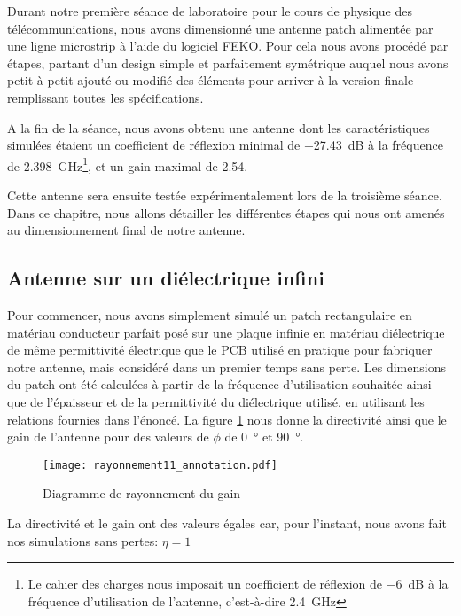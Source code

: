 Durant notre première séance de laboratoire pour le cours de physique des télécommunications, nous avons dimensionné une antenne patch alimentée par une ligne microstrip à l'aide du logiciel FEKO. Pour cela nous avons procédé par étapes, partant d'un design simple et parfaitement symétrique auquel nous avons petit à petit ajouté ou modifié des éléments pour arriver à la version finale remplissant toutes les spécifications.

A la fin de la séance, nous avons obtenu une antenne dont les caractéristiques simulées étaient un coefficient de réflexion minimal de \SI{-27.43}{\deci\bel} à la fréquence de \SI{2.398}{\giga\hertz}\footnote{Le cahier des charges nous imposait un coefficient de réflexion de \SI{-6}{\deci\bel} à la fréquence d'utilisation de l'antenne, c'est-à-dire \SI{2.4}{\giga\hertz}}, et un gain maximal de \num{2.54}.

Cette antenne sera ensuite testée expérimentalement lors de la troisième séance. Dans ce chapitre, nous allons détailler les différentes étapes qui nous ont amenés au dimensionnement final de notre antenne.

\subsection{Antenne sur un diélectrique infini}
Pour commencer, nous avons simplement simulé un patch rectangulaire en matériau conducteur parfait posé sur une plaque infinie en matériau diélectrique de même permittivité électrique que le PCB utilisé en pratique pour fabriquer notre antenne, mais considéré dans un premier temps sans perte. Les dimensions du patch ont été calculées à partir de la fréquence d'utilisation souhaitée ainsi que de l'épaisseur et de la permittivité du diélectrique utilisé, en utilisant les relations fournies dans l'énoncé. La figure \ref{fig:rayonnement_11} nous donne la directivité ainsi que le gain de l'antenne pour des valeurs de $\phi$ de \SI{0}{\degree} et \SI{90}{\degree}.
\begin{figure}[htbp]
  \centering
  \texttt{[image: rayonnement11\_annotation.pdf]}
  \caption{Diagramme de rayonnement du gain \label{fig:rayonnement_11}}
\end{figure}
La directivité et le gain ont des valeurs égales car, pour l'instant, nous avons fait nos simulations sans pertes: $\eta = 1$

